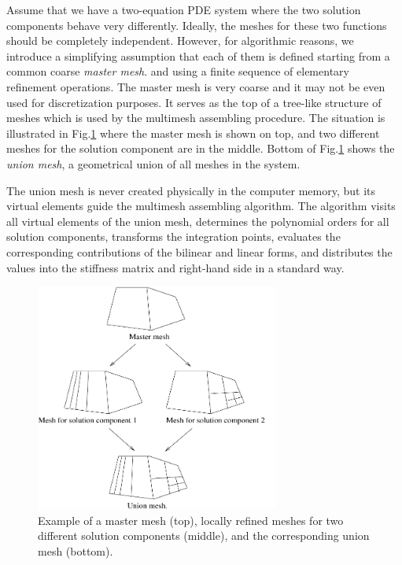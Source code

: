 \documentclass[final,3p,times,twocolumn]{elsarticle}
\begin{document}
Assume that we have a two-equation PDE
system where the two solution components behave very differently. 
Ideally, the meshes for these two functions should be completely 
independent. However, for algorithmic reasons, we introduce a simplifying 
assumption that each of them is defined starting from a common coarse 
{\em master mesh}. and using a finite sequence of elementary refinement 
operations. The master mesh is very coarse and it may not  
be even used for discretization purposes. It serves as the top of 
a tree-like structure of meshes which is used by the multimesh 
assembling procedure. The situation is illustrated in Fig.\ref{fig:multimesh}
where the master mesh is shown on top, and two different meshes for the solution 
component are in the middle. Bottom of Fig.\ref{fig:multimesh} shows the 
{\em union mesh}, a geometrical union of all meshes in the system. 

The union mesh is never created physically in the computer memory, but its 
virtual elements guide the 
multimesh assembling algorithm. The algorithm visits all virtual elements 
of the union mesh, determines the polynomial orders for all solution components, 
transforms the integration points, evaluates the corresponding contributions 
of the bilinear and linear forms, and distributes the values into 
the stiffness matrix and right-hand side in a standard way.

\begin{figure}[h]
  \smallskip
  \centering
  \includegraphics[width=8cm]{multi.pdf}
  \vspace{-4mm}
  \caption{Example of a master mesh (top), locally refined 
           meshes for two different solution components (middle),
           and the corresponding union mesh (bottom).}
  \label{fig:multimesh}
\end{figure}
\end{document}
